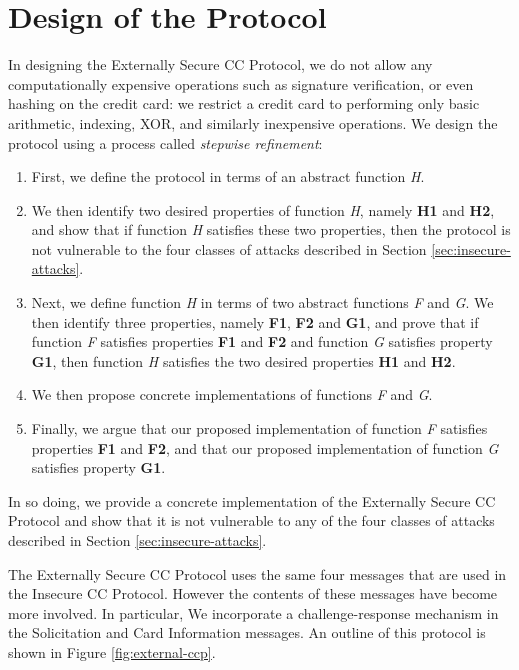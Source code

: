 \section{Design of the Protocol}
\label{sec:external-design}

In designing the Externally Secure CC Protocol, we do not allow any computationally expensive operations such as signature verification, or even hashing on the credit card:
	we restrict a credit card to performing only basic arithmetic, indexing, XOR, and similarly inexpensive operations.
We design the protocol using a process called \emph{stepwise refinement}:
\begin{enumerate}
\item First, we define the protocol in terms of an abstract function \emph{H}.
\item We then identify two desired properties of function \emph{H}, namely \textbf{H1} and \textbf{H2},
	and show that if function \emph{H} satisfies these two properties,
	then the protocol is not vulnerable to the four classes of attacks described in Section \ref{sec:insecure-attacks}.
\item Next, we define function \emph{H} in terms of two abstract functions \emph{F} and \emph{G}.
We then identify three properties, namely \textbf{F1}, \textbf{F2} and \textbf{G1},
	and prove that if function \emph{F} satisfies properties \textbf{F1} and \textbf{F2}
	and function \emph{G} satisfies property \textbf{G1}, then function \emph{H} satisfies the two desired properties \textbf{H1} and \textbf{H2}.
\item We then propose concrete implementations of functions \emph{F} and \emph{G}.
\item Finally, we argue that our proposed implementation of function \emph{F} satisfies properties \textbf{F1} and \textbf{F2},
	and that our proposed implementation of function \emph{G} satisfies property \textbf{G1}.
\end{enumerate}

In so doing, we provide a concrete implementation of the Externally Secure CC Protocol
	and show that it is not vulnerable to any of the four classes of attacks described in Section \ref{sec:insecure-attacks}.

The Externally Secure CC Protocol uses the same four messages that are used in the Insecure CC Protocol.
However the contents of these messages have become more involved.
In particular, We incorporate a challenge-response mechanism in the Solicitation and Card Information messages.
An outline of this protocol is shown in Figure \ref{fig:external-ccp}.

